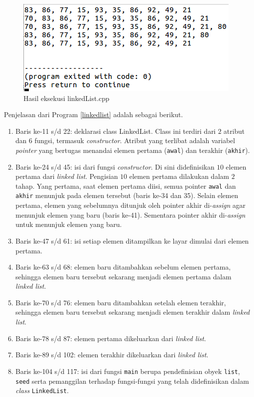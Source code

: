 \scriptsize

\normalsize

\begin{figure}[H]
\centering
\includegraphics[scale=.5]{pics/hasillinkedlist.png}
\caption{Hasil eksekusi linkedList.cpp}
\label{fig:linkedList}
\end{figure}

Penjelasan dari Program \ref{linkedlist} adalah sebagai berikut.
\begin{enumerate}
\item Baris ke-11 s/d 22: deklarasi class LinkedList. Class ini terdiri dari $2$ atribut dan $6$ fungsi, termasuk \textit{constructor}. Atribut yang terlibat adalah variabel \textit{pointer} yang bertugas menandai elemen pertama (\texttt{awal}) dan terakhir (\texttt{akhir}).
\item Baris ke-24 s/d 45: isi dari fungsi \textit{constructor}. Di sini didefinisikan $10$ elemen pertama dari \textit{linked list}. Pengisian $10$ elemen pertama dilakukan dalam $2$ tahap. Yang pertama, saat elemen pertama diisi, semua pointer \texttt{awal} dan \texttt{akhir} menunjuk pada elemen tersebut (baris ke-34 dan 35). Selain elemen pertama, elemen yang sebelumnya ditunjuk oleh pointer akhir di-\textit{assign} agar menunjuk elemen yang baru (baris ke-41). Sementara pointer akhir di-\textit{assign} untuk menunjuk elemen yang baru.
\item Baris ke-47 s/d 61: isi setiap elemen ditampilkan ke layar dimulai dari elemen pertama.
\item Baris ke-63 s/d 68: elemen baru ditambahkan sebelum elemen pertama, sehingga elemen baru tersebut sekarang menjadi elemen pertama dalam \textit{linked list}.
\item Baris ke-70 s/d 76: elemen baru ditambahkan setelah elemen terakhir, sehingga elemen baru tersebut sekarang menjadi elemen terakhir dalam \textit{linked list}.
\item Baris ke-78 s/d 87: elemen pertama dikeluarkan dari \textit{linked list}.
\item Baris ke-89 s/d 102: elemen terakhir dikeluarkan dari \textit{linked list}.
\item Baris ke-104 s/d 117: isi dari fungsi \texttt{main} berupa pendefinisian obyek \texttt{list}, \texttt{seed} serta pemanggilan terhadap fungsi-fungsi yang telah didefinisikan dalam \textit{class} \texttt{LinkedList}.
\end{enumerate}

